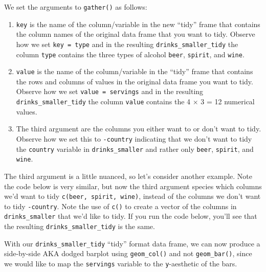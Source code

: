\documentclass[12pt, krantz2,]{krantz}
\makeatletter
\newenvironment{Shaded}{\begin{snugshade}}{\end{snugshade}}
\newcommand{\DataTypeTok}[1]{\textcolor[rgb]{0.27,0.27,0.27}{#1}}
\newcommand{\KeywordTok}[1]{\textcolor[rgb]{0.27,0.27,0.27}{\textbf{#1}}}
\newcommand{\NormalTok}[1]{#1}
\newcommand{\OperatorTok}[1]{\textcolor[rgb]{0.43,0.43,0.43}{\textbf{#1}}}
\newcommand{\StringTok}[1]{\textcolor[rgb]{0.5,0.5,0.5}{#1}}
\providecommand{\tightlist}{%
  \setlength{\itemsep}{0pt}\setlength{\parskip}{0pt}}
\newenvironment{kframe}{%
\medskip{}
\setlength{\fboxsep}{.8em}
 \def\at@end@of@kframe{}%
 \ifinner\ifhmode%
  \def\at@end@of@kframe{\end{minipage}}%
  \begin{minipage}{\columnwidth}%
 \fi\fi%
 \def\FrameCommand##1{\hskip\@totalleftmargin \hskip-\fboxsep
 \colorbox{shadecolor}{##1}\hskip-\fboxsep
     \hskip-\linewidth \hskip-\@totalleftmargin \hskip\columnwidth}%
 \MakeFramed {\advance\hsize-\width
   \@totalleftmargin\z@ \linewidth\hsize
   \@setminipage}}%
 {\par\unskip\endMakeFramed%
 \at@end@of@kframe}
\renewenvironment{Shaded}{\begin{kframe}}{\end{kframe}}
\makeatother
\begin{document}
We set the arguments to \texttt{gather()} as follows:

\begin{enumerate}
\def\labelenumi{\arabic{enumi}.}
\tightlist
\item
  \texttt{key} is the name of the column/variable in the new ``tidy'' frame that contains the column names of the original data frame that you want to tidy. Observe how we set \texttt{key\ =\ type} and in the resulting \texttt{drinks\_smaller\_tidy} the column \texttt{type} contains the three types of alcohol \texttt{beer}, \texttt{spirit}, and \texttt{wine}.
\item
  \texttt{value} is the name of the column/variable in the ``tidy'' frame that contains the rows and columns of values in the original data frame you want to tidy. Observe how we set \texttt{value\ =\ servings} and in the resulting \texttt{drinks\_smaller\_tidy} the column \texttt{value} contains the 4 \(\times\) 3 = 12 numerical values.
\item
  The third argument are the columns you either want to or don't want to tidy. Observe how we set this to \texttt{-country} indicating that we don't want to tidy the \texttt{country} variable in \texttt{drinks\_smaller} and rather only \texttt{beer}, \texttt{spirit}, and \texttt{wine}.
\end{enumerate}

The third argument is a little nuanced, so let's consider another example. Note the code below is very similar, but now the third argument species which columns we'd want to tidy \texttt{c(beer,\ spirit,\ wine)}, instead of the columns we don't want to tidy \texttt{-country}. Note the use of \texttt{c()} to create a vector of the columns in \texttt{drinks\_smaller} that we'd like to tidy. If you run the code below, you'll see that the resulting \texttt{drinks\_smaller\_tidy} is the same.

\begin{Shaded}
\end{Shaded}

With our \texttt{drinks\_smaller\_tidy} ``tidy'' format data frame, we can now produce a side-by-side AKA dodged barplot using \texttt{geom\_col()} and not \texttt{geom\_bar()}, since we would like to map the \texttt{servings} variable to the \texttt{y}-aesthetic of the bars.
\end{document}
